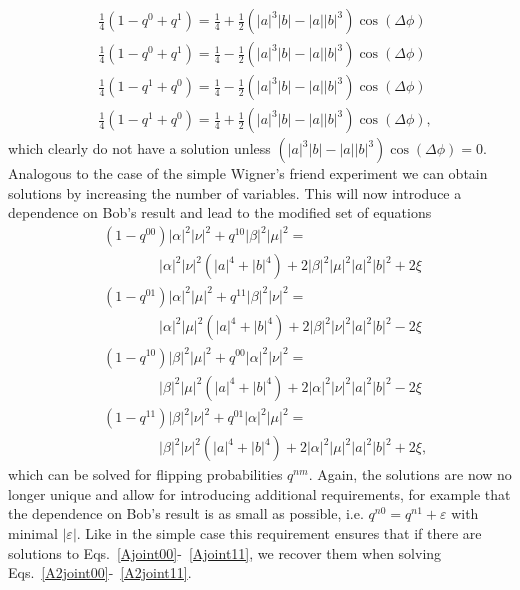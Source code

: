 \documentclass[a4paper,twocolumn,11pt,accepted=2017-05-09,dvipsnames]{quantumarticle}
\numberwithin{equation}{section}
\begin{document}
\begin{appendix}
\begin{align}
\nonumber
&\frac{1}{4} \left( 1-q^0+q^1\right)= \frac{1}{4}+\frac{1}{2}(|a|^3 |b|-|a| |b|^3)\cos(\Delta\phi) \\
\nonumber
&\frac{1}{4} \left( 1-q^0+q^1\right)= \frac{1}{4}-\frac{1}{2}(|a|^3 |b|-|a| |b|^3)\cos(\Delta\phi) \\
\nonumber
&\frac{1}{4} \left(1-q^1+q^0\right)= \frac{1}{4}-\frac{1}{2}(|a|^3 |b|-|a| |b|^3)\cos(\Delta\phi)\\
\nonumber
 &\frac{1}{4} \left( 1-q^1+q^0\right)= \frac{1}{4}+\frac{1}{2}(|a|^3 |b|-|a| |b|^3)\cos(\Delta\phi),
\end{align}
which clearly do not have a solution unless $(|a|^3 |b|-|a| |b|^3)\cos(\Delta\phi)=0$. Analogous to the case of the simple Wigner's friend experiment we can obtain solutions by increasing the number of variables. This will now introduce a dependence on Bob's result and lead to the modified set of equations
\begin{align}
\label{A2joint00}
&(1-q^{00})|\alpha|^2 |\nu|^2+q^{10}|\beta|^2|\mu|^2= \\
	&\qquad \qquad |\alpha|^2 |\nu|^2 (|a|^4+|b|^4)+ 2 |\beta|^2 |\mu|^2|a|^2|b|^2 +2\xi\nonumber \\
\label{A2joint01}
&(1-q^{01})|\alpha|^2 |\mu|^2+q^{11}|\beta|^2|\nu|^2= \\
 	&\qquad \qquad |\alpha|^2 |\mu|^2 (|a|^4+|b|^4)+ 2 |\beta|^2 |\nu|^2|a|^2|b|^2 - 2\xi \nonumber \\
 \label{A2joint10}
&(1-q^{10})|\beta|^2|\mu|^2 +q^{00}|\alpha|^2 |\nu|^2 =\\
	&\qquad \qquad |\beta|^2 |\mu|^2 (|a|^4+|b|^4)+2 |\alpha|^2 |\nu|^2|a|^2|b|^2 - 2\xi \nonumber \\
\label{A2joint11}
 &(1-q^{11})|\beta|^2|\nu|^2+q^{01}|\alpha|^2 |\mu|^2 =\\
 	& \qquad \qquad |\beta|^2 |\nu|^2 (|a|^4+|b|^4)+ 2 |\alpha|^2 |\mu|^2|a|^2|b|^2 +2\xi,\nonumber   
\end{align}
which can be solved for flipping probabilities $q^{nm}$. Again, the solutions are now no longer unique and allow for introducing additional requirements, for example that the dependence on Bob's result is as small as possible, i.e. $q^{n0}=q^{n1}+\varepsilon$ with minimal $|\varepsilon|$. Like in the simple case this requirement ensures that if there are solutions to Eqs.~\eqref{Ajoint00}-~\eqref{Ajoint11}, we recover them when solving Eqs.~\eqref{A2joint00}-~\eqref{A2joint11}. 


\end{appendix}
\end{document}
